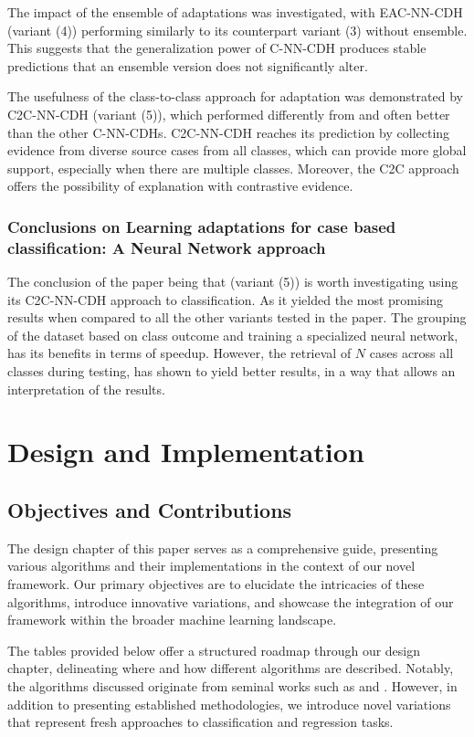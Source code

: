\documentclass[a4paper, 12pt]{report}
\begin{document}
The impact of the ensemble of adaptations was investigated, with EAC-NN-CDH (variant (4)) performing similarly to its counterpart variant (3) without ensemble.
This suggests that the generalization power of C-NN-CDH produces stable predictions that an ensemble version does not significantly alter.

The usefulness of the class-to-class approach for adaptation was demonstrated by C2C-NN-CDH (variant (5)), which performed differently from and often better than the other C-NN-CDHs.
C2C-NN-CDH reaches its prediction by collecting evidence from diverse source cases from all classes,
which can provide more global support, especially when there are multiple classes. Moreover,
the C2C approach offers the possibility of explanation with contrastive evidence.

\subsection{Conclusions on Learning adaptations for case based classification: A Neural Network approach}
The conclusion of the paper \cite{ye2021learning} being that (variant (5)) is worth investigating using its C2C-NN-CDH approach to classification.
As it yielded the most promising results when compared to all the other variants tested in the paper. The grouping of the dataset based on class outcome and training a specialized neural network,
has its benefits in terms of speedup. However, the retrieval of $N$ cases across all classes during testing, has shown to yield better results, in a way that allows an interpretation of the results.

\chapter{Design and Implementation}
\label{ch:Design}

\section*{Objectives and Contributions}

The design chapter of this paper serves as a comprehensive guide, presenting various algorithms and their implementations in the context of our novel framework. 
Our primary objectives are to elucidate the intricacies of these algorithms, introduce innovative variations, and 
showcase the integration of our framework within the broader machine learning landscape.

The tables provided below offer a structured roadmap through our design chapter, delineating where and how different algorithms are described. 
Notably, the algorithms discussed originate from seminal works such as \cite{learningFromDifferences2022} and \cite{ye2021learning}. 
However, in addition to presenting established methodologies, we introduce novel variations that represent fresh approaches to classification and regression tasks.
\end{document}
